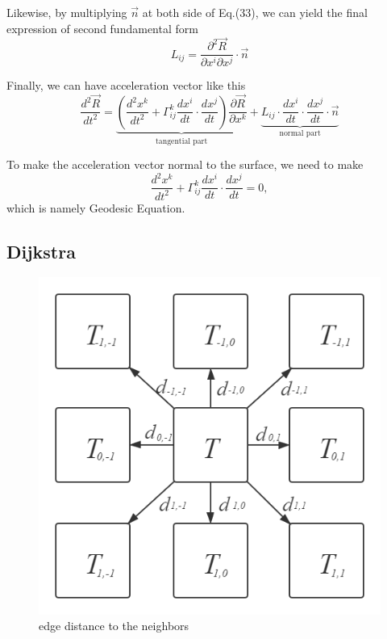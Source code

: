 \documentclass{article}
\theoremstyle{definition}
\theoremstyle{plain}
\begin{document}
Likewise, by multiplying $\vec{n}$ at both side of Eq.(33), we can yield the final expression of second fundamental form
\begin{equation}
    \boxed{L_{ij}=\frac{\partial^2\vec{R}}{\partial x^i\partial x^j}\cdot \vec{n}}
\end{equation}

Finally, we can have acceleration vector like this
\begin{equation}
    \frac{d^2\vec{R}}{dt^2}=\underbrace{\left(\frac{d^2x^k}{dt^2}+\Gamma_{ij}^k\frac{dx^i}{dt}\cdot\frac{dx^j}{dt}\right)\frac{\partial\vec{R}}{\partial x^k}}_{\text{tangential part}}+\underbrace{L_{ij}\cdot\frac{dx^i}{dt}\cdot\frac{dx^j}{dt}\cdot\vec{n}}_{\text{normal part}}
\end{equation}

To make the acceleration vector normal to the surface, we need to make
\begin{equation}
    \boxed{\frac{d^2x^k}{dt^2}+\Gamma_{ij}^k\frac{dx^i}{dt}\cdot\frac{dx^j}{dt}=0},
\end{equation}
which is namely Geodesic Equation.

\subsection{Dijkstra}
\begin{figure}[H]
   \centering
   \includegraphics[scale=0.5]{figure/dijkstra.png}
   \caption{edge distance to the neighbors}
\end{figure}
\end{document}

